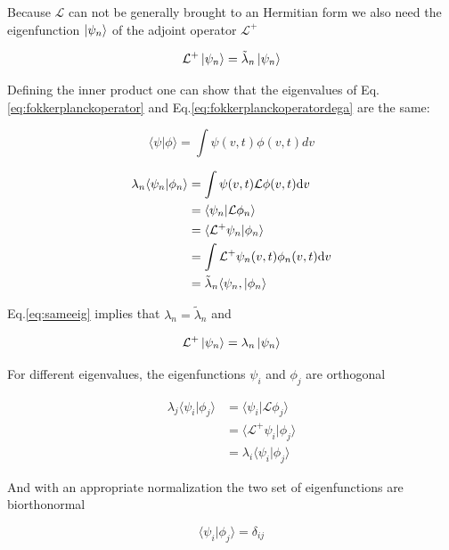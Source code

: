 \documentclass[a4paper,11pt,twoside]{article}
\def \dd  {{\rm d}}
\numberwithin{equation}{section}
\begin{document}
Because $\mathcal{L}$ can not be generally brought to an Hermitian form we also need  the eigenfunction $\ket{\psi_n}$ of the adjoint operator  $\mathcal{L}^{+}$

\begin{equation}
\label{eq:fokkerplanckoperatordega}
\mathcal{L}^+\ket{\psi_n}=\tilde{\lambda}_n\ket{\psi_n}
\end{equation}

Defining the inner product one can show that the eigenvalues of Eq.\eqref{eq:fokkerplanckoperator} and Eq.\eqref{eq:fokkerplanckoperatordega} are the same:

\begin{equation}
\label{eq:innerproduct}
\langle\psi|\phi\rangle=\int\psi(v,t)\phi(v,t)dv
\end{equation}

\begin{align}
\lambda_n\langle\psi_n|\phi_n\rangle &=\int\psi(v,t)\mathcal{L}\phi(v,t)\dd v  \nonumber \\
&=\langle\psi_n|\mathcal{L}\phi_n\rangle \nonumber \\
&=\langle\mathcal{L}^+\psi_n|\phi_n\rangle  \nonumber \\
&=\int\mathcal{L}^+\psi_n(v,t)\phi_n(v,t)\dd v \nonumber \\
&=\tilde{\lambda}_n\langle\psi_n,|\phi_n\rangle \label{eq:sameeig}
\end{align}

Eq.\eqref{eq:sameeig} implies that $\lambda_n=\tilde{\lambda}_n$ and

\begin{equation}
\label{eq:fokkerplanckoperatordega2}
\mathcal{L}^+\ket{\psi_n}=\lambda_n\ket{\psi_n}
\end{equation}


For different eigenvalues, the eigenfunctions $\psi_i$ and $\phi_j$ are orthogonal

\begin{align}
\lambda_j\langle\psi_i|\phi_j\rangle
&=\langle\psi_i|\mathcal{L}\phi_j\rangle \nonumber \\
&=\langle\mathcal{L}^+\psi_i|\phi_j\rangle  \nonumber \\
&=\lambda_i\langle\psi_i|\phi_j\rangle \label{eq:lorthogonal}
\end{align}

And with an appropriate normalization the two set of eigenfunctions are biorthonormal

\begin{equation}
\label{eq:dij}
\langle\psi_i|\phi_j\rangle=\delta_{ij}
\end{equation}
\end{document}
